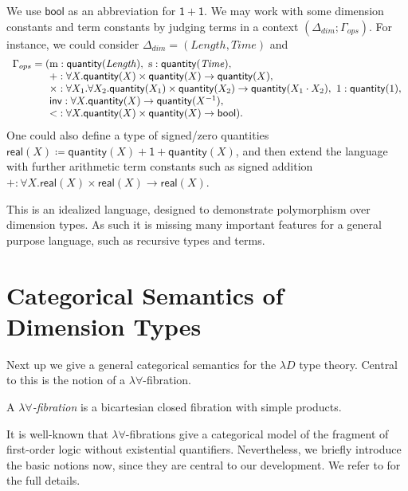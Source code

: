 \documentclass[a4paper,UKenglish]{lipics}
\theoremstyle{plain}
\newcommand{\msf}[1]{\mathsf{#1}} %
\newcommand{\unitTy}{\msf{1}}
\newcommand{\qnt}{\msf{quantity}}
\newcommand{\sreal}{\msf{real}}
\newcommand{\bool}{\msf{bool}}
\newcommand{\lengthDim}{\mathit{Length}}
\newcommand{\timeDim}{\mathit{Time}}
\newcommand{\Deltadim}{\ensuremath{\Delta_{dim}}}
\newcommand{\Gammaops}{\ensuremath{\Gamma_{ops}}}
\newcommand{\Dvar}{X}
\begin{document}
%
We use $\bool$ as an abbreviation for $\unitTy + \unitTy$.
We may work with some dimension constants and term constants
by judging terms in a context $(\Deltadim;\Gammaops)$.
For instance, we could consider $\Deltadim = (\lengthDim, \timeDim)$ and
\[\begin{array}{r@{}l}\Gammaops = (
&\mathrm{m}:\qnt(\lengthDim),
\ \mathrm{s}:\qnt(\timeDim),
\\&+:\forall \Dvar. \qnt(\Dvar)\times  \qnt(\Dvar) \rightarrow \qnt(\Dvar),
\\&\times :\forall \Dvar_1. \forall \Dvar_2. \qnt(\Dvar_1)\times \qnt(\Dvar_2) \rightarrow \qnt(\Dvar_1 \cdot \Dvar_2),
\ 1:\qnt(1),
\\&\mathsf{inv}:\forall \Dvar.\qnt(\Dvar)\to \qnt (\Dvar^{-1}),
\\& {<}:\forall \Dvar.\qnt(\Dvar)\times \qnt(\Dvar)\to \bool)\text.
\end{array}\]
%
One could also define a type of signed/zero quantities $\sreal(\Dvar)\coloneqq \qnt(\Dvar)+\unitTy+\qnt(\Dvar)$, and then extend the language with further arithmetic term constants such as signed addition $+:\forall \Dvar.\sreal(\Dvar)\times \sreal(\Dvar)\to\sreal(\Dvar)$.

This is an idealized language, designed to demonstrate polymorphism over dimension types. As such it is missing many important features for a general purpose language, such as recursive types and terms.

\section{Categorical Semantics of Dimension Types} \label{sec:sem}
Next up we give a general categorical semantics for the $\lambda D$ type theory. Central to this is the notion of a $\lambda \forall$-fibration.

\begin{definition}
A \emph{$\lambda\forall$-fibration} is a bicartesian closed fibration with simple products.
\end{definition}

It is well-known that $\lambda \forall$-fibrations give a categorical model of the fragment of first-order logic without existential quantifiers. Nevertheless, we briefly introduce the basic notions now, since they are central to our development. We refer to \cite{jacobs1999categorical} for the full details.
\end{document}
